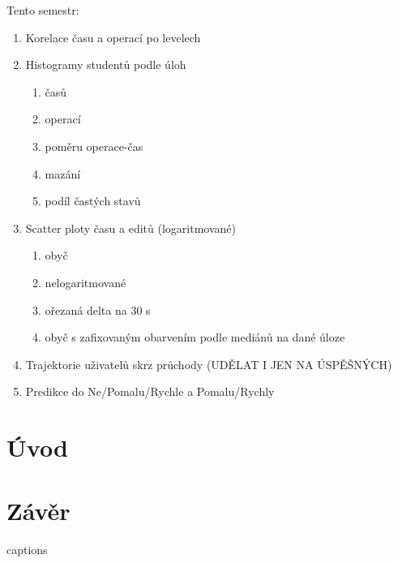 \documentclass[
  digital, %
  table,   %
  nolof,     %
  nolot,     %
]{fithesis3}
\begin{document}
Tento semestr:
\begin{enumerate}
	\item Korelace času a operací po levelech
	\item Histogramy studentů podle úloh
	\begin{enumerate}
		\item časů
		\item operací
		\item poměru operace-čas
		\item mazání
		\item podíl častých stavů
	\end{enumerate}
	\item Scatter ploty času a editů (logaritmované)
	\begin{enumerate}
		\item obyč
		\item nelogaritmované
		\item ořezaná delta na 30 s
		\item obyč s zafixovaným obarvením podle mediánů na dané úloze
	\end{enumerate}
	\item Trajektorie uživatelů skrz průchody (UDĚLAT I JEN NA ÚSPĚŠNÝCH)
	\item Predikce do Ne/Pomalu/Rychle a Pomalu/Rychly 
		

\end{enumerate}


\chapter{Úvod}



\chapter{Závěr}


\nocite{*}

{\csname captions\languagename\endcsname %
\makeatletter %
  \thesis@selectLocale{\thesis@locale}\makeatother
\printbibliography[heading=bibintoc]} %



\appendix %
\end{document}

